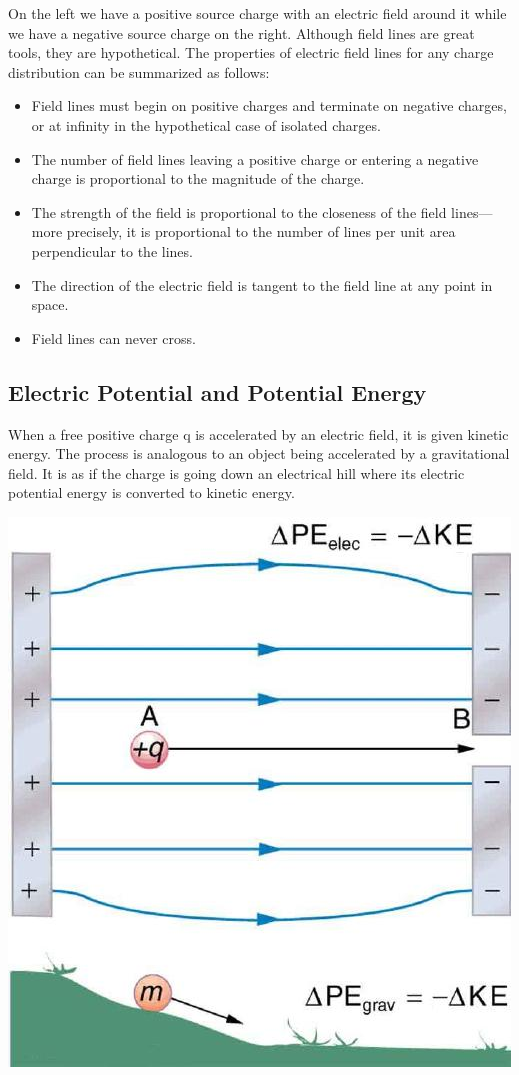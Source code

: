 \documentclass[9pt]{exam}
\begin{document}
	On the left we have a positive source charge with an electric field around it while we have a negative source charge on the right. Although field lines are great tools, they are hypothetical. The properties of electric field lines for any charge distribution can be summarized as follows: \begin{itemize}
		\item Field lines must begin on positive charges and terminate on negative charges, or at infinity in the hypothetical case of isolated charges.
		\item The number of field lines leaving a positive charge or entering a negative charge is proportional to the magnitude of the charge.
		\item The strength of the field is proportional to the closeness of the field lines—more precisely, it is proportional to the number of lines per unit area perpendicular to the lines.
		\item The direction of the electric field is tangent to the field line at any point in space.
		\item Field lines can never cross.
	\end{itemize}
		\begin{center}
		\section*{Electric Potential and Potential Energy}	
	\end{center}
	When a free positive charge  q  is accelerated by an electric field, it is given kinetic energy. The process is analogous to an object being accelerated by a gravitational field. It is as if the charge is going down an electrical hill where its electric potential energy is converted to kinetic energy. 
	\begin{center}
		\includegraphics[scale=0.5]{pe_analogy}
	\end{center}
\end{document}
